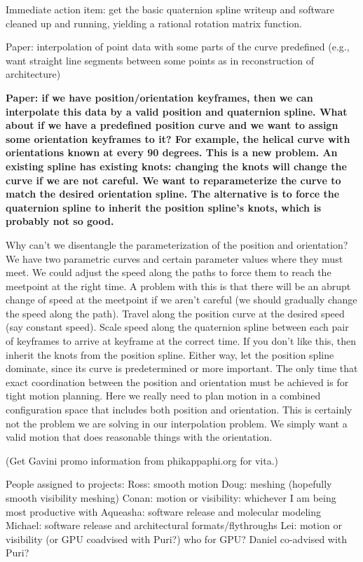 \documentclass[12pt]{article}
\begin{document}
Immediate action item: 
get the basic quaternion spline writeup and software cleaned up and running, 
yielding a rational rotation matrix function.

Paper: interpolation of point data with some parts of the curve predefined (e.g., want
       straight line segments between some points as in reconstruction of architecture)

{\bf Paper: if we have position/orientation keyframes, then we can interpolate this data
       by a valid position and quaternion spline.
       What about if we have a predefined position curve and we want to assign some
       orientation keyframes to it?  For example, the helical curve with orientations
       known at every 90 degrees.  This is a new problem.
       An existing spline has existing knots: changing the knots will change the curve 
       if we are not careful.
       We want to reparameterize the curve to match the desired orientation spline.
       The alternative is to force the quaternion spline to inherit the position spline's
       knots, which is probably not so good.

       Why can't we disentangle the parameterization of the position and orientation?
       We have two parametric curves and certain parameter values where they must
       meet.  We could adjust the speed along the paths to force them to reach the
       meetpoint at the right time.  A problem with this is that there will be an
       abrupt change of speed at the meetpoint if we aren't careful (we should gradually
       change the speed along the path).
       Travel along the position curve at the desired speed (say constant speed).
       Scale speed along the quaternion spline between each pair of keyframes
       to arrive at keyframe at the correct time.  If you don't like this, then
       inherit the knots from the position spline.  Either way, let the position
       spline dominate, since its curve is predetermined or more important.
       The only time that exact coordination between the position and orientation
       must be achieved is for tight motion planning.  Here we really need to
       plan motion in a combined configuration space that includes both position
       and orientation.  This is certainly not the problem we are solving in our 
       interpolation problem.  We simply want a valid motion that does reasonable
       things with the orientation.
}

(Get Gavini promo information from phikappaphi.org for vita.)

People assigned to projects:
Ross: smooth motion
Doug: meshing (hopefully smooth visibility meshing)
Conan: motion or visibility: whichever I am being most productive with
Aqueasha: software release and molecular modeling
Michael: software release and architectural formats/flythroughs
Lei: motion or visibility (or GPU coadvised with Puri?)
who for GPU? Daniel co-advised with Puri?
\end{document}
